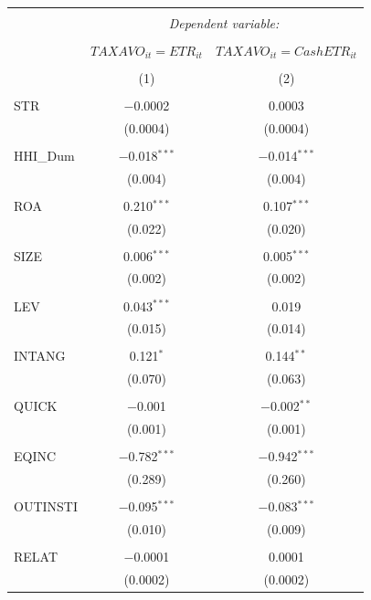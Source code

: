 \documentclass[a4paper]{article}\usepackage[]{graphicx}\usepackage[]{color}
\begin{document}
\begin{table}[!htbp] \centering 
  \caption{} 
  \label{E1} 
\begin{tabular}{@{\extracolsep{5pt}}lcc} 
\\[-1.8ex]\hline 
\hline \\[-1.8ex] 
 & \multicolumn{2}{c}{\textit{Dependent variable:}} \\ 
\cline{2-3} 
\\[-1.8ex] & $TAXAVO_{it}=ETR_{it}$ & $TAXAVO_{it}=CashETR_{it}$ \\ 
\\[-1.8ex] & (1) & (2)\\ 
\hline \\[-1.8ex] 
 STR & $-$0.0002 & 0.0003 \\ 
  & (0.0004) & (0.0004) \\ 
  & & \\ 
 HHI\_Dum & $-$0.018$^{***}$ & $-$0.014$^{***}$ \\ 
  & (0.004) & (0.004) \\ 
  & & \\ 
 ROA & 0.210$^{***}$ & 0.107$^{***}$ \\ 
  & (0.022) & (0.020) \\ 
  & & \\ 
 SIZE & 0.006$^{***}$ & 0.005$^{***}$ \\ 
  & (0.002) & (0.002) \\ 
  & & \\ 
 LEV & 0.043$^{***}$ & 0.019 \\ 
  & (0.015) & (0.014) \\ 
  & & \\ 
 INTANG & 0.121$^{*}$ & 0.144$^{**}$ \\ 
  & (0.070) & (0.063) \\ 
  & & \\ 
 QUICK & $-$0.001 & $-$0.002$^{**}$ \\ 
  & (0.001) & (0.001) \\ 
  & & \\ 
 EQINC & $-$0.782$^{***}$ & $-$0.942$^{***}$ \\ 
  & (0.289) & (0.260) \\ 
  & & \\ 
 OUTINSTI & $-$0.095$^{***}$ & $-$0.083$^{***}$ \\ 
  & (0.010) & (0.009) \\ 
  & & \\ 
 RELAT & $-$0.0001 & 0.0001 \\ 
  & (0.0002) & (0.0002) \\ 

\end{tabular}
\end{table}
\end{document}

